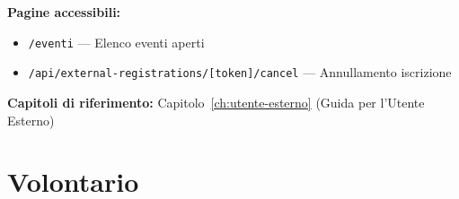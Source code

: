 \documentclass[a4paper,11pt,oneside]{book}
\newcommand{\percorso}[1]{\textcolor{namoCyan}{\texttt{#1}}}
\begin{document}
\begin{tcolorbox}
\vspace{0.5em}
\textbf{Pagine accessibili:}
\begin{itemize}[leftmargin=1.5em, topsep=2pt, itemsep=2pt]
  \item \percorso{/eventi} --- Elenco eventi aperti
  \item \percorso{/api/external-registrations/[token]/cancel} --- Annullamento iscrizione
\end{itemize}

\vspace{0.5em}
\textbf{Capitoli di riferimento:} Capitolo~\ref{ch:utente-esterno} (Guida per l'Utente Esterno)
\end{tcolorbox}

\section{Volontario}
\label{sec:quick-volontario}
\end{document}
